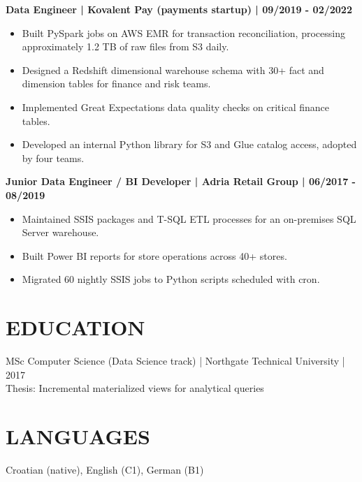 \documentclass[11pt,a4paper]{article}
\begin{document}
\textbf{Data Engineer | Kovalent Pay (payments startup) | 09/2019 - 02/2022}
\begin{itemize}
\item Built PySpark jobs on AWS EMR for transaction reconciliation, processing approximately 1.2 TB of raw files from S3 daily.
\item Designed a Redshift dimensional warehouse schema with 30+ fact and dimension tables for finance and risk teams.
\item Implemented Great Expectations data quality checks on critical finance tables.
\item Developed an internal Python library for S3 and Glue catalog access, adopted by four teams.
\end{itemize}

\textbf{Junior Data Engineer / BI Developer | Adria Retail Group | 06/2017 - 08/2019}
\begin{itemize}
\item Maintained SSIS packages and T-SQL ETL processes for an on-premises SQL Server warehouse.
\item Built Power BI reports for store operations across 40+ stores.
\item Migrated 60 nightly SSIS jobs to Python scripts scheduled with cron.
\end{itemize}

\section*{EDUCATION}
MSc Computer Science (Data Science track) | Northgate Technical University | 2017\\
Thesis: Incremental materialized views for analytical queries

\section*{LANGUAGES}
Croatian (native), English (C1), German (B1)
\end{document}
